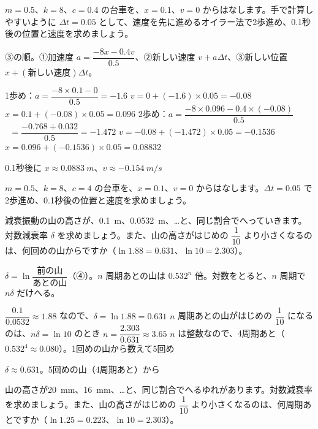 \begin{reidai}
$m=0.5$、$k=8$、$c=0.4$ の台車を、$x=0.1$、$v=0$ からはなします。手で計算しやすいように $\Delta t=0.05$ として、速度を先に進めるオイラー法で2歩進め、0.1秒後の位置と速度を求めましょう。\par
\kangaekata ③の順。①加速度 $a=\dfrac{-8x-0.4v}{0.5}$、②新しい速度 $v+a\Delta t$、③新しい位置 $x+(\text{新しい速度})\Delta t$。\par
\shiki
\kviha 1歩め：$a=\dfrac{-8\times0.1-0}{0.5}=-1.6$
\kvihb $v=0+(-1.6)\times0.05=-0.08$
\kvihb $x=0.1+(-0.08)\times0.05=0.096$
\kviha 2歩め：$a=\dfrac{-8\times0.096-0.4\times(-0.08)}{0.5}$
\kvihb $\phantom{a}=\dfrac{-0.768+0.032}{0.5}=-1.472$
\kvihb $v=-0.08+(-1.472)\times0.05=-0.1536$
\kvihb $x=0.096+(-0.1536)\times0.05=0.08832$\par
\kotae 0.1秒後に $x\approx\qty{0.0883}{m}$、$v\approx\qty{-0.154}{m/s}$
\end{reidai}

\begin{jibun}
$m=0.5$、$k=8$、$c=4$ の台車を、$x=0.1$、$v=0$ からはなします。$\Delta t=0.05$ で2歩進め、0.1秒後の位置と速度を求めましょう。
\end{jibun}

\begin{reidai}
減衰振動の山の高さが、\qty{0.1}{m}、\qty{0.0532}{m}、…と、同じ割合でへっていきます。対数減衰率 $\delta$ を求めましょう。また、山の高さがはじめの $\dfrac{1}{10}$ より小さくなるのは、何回めの山からですか（$\ln1.88=0.631$、$\ln10=2.303$）。\par
\kangaekata $\delta=\ln\dfrac{\text{前の山}}{\text{あとの山}}$（④）。$n$ 周期あとの山は $0.532^n$ 倍。対数をとると、$n$ 周期で $n\delta$ だけへる。\par
\shiki
\kviha $\dfrac{0.1}{0.0532}\approx1.88$ なので、$\delta=\ln1.88=0.631$
\kviha $n$ 周期あとの山がはじめの $\dfrac{1}{10}$ になるのは、$n\delta=\ln10$ のとき
\kviha $n=\dfrac{2.303}{0.631}\approx3.65$
\kviha $n$ は整数なので、4周期あと（$0.532^4\approx0.080$）。1回めの山から数えて5回め\par
\kotae $\delta\approx0.631$。5回めの山（4周期あと）から
\end{reidai}

\begin{jibun}
山の高さが\qty{20}{mm}、\qty{16}{mm}、…と、同じ割合でへるゆれがあります。対数減衰率を求めましょう。また、山の高さがはじめの $\dfrac{1}{10}$ より小さくなるのは、何周期あとですか（$\ln1.25=0.223$、$\ln10=2.303$）。
\end{jibun}

